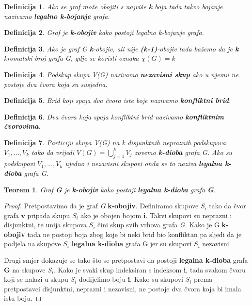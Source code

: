\documentclass[times, utf8, diplomski, numeric]{fer}
\newtheorem{definition}{Definicija}
\newtheorem{theorem}{Teorem}
\begin{document}
\begin{definition}
Ako se graf može obojiti s najviše \textbf{k} boja tada takvo bojanje nazivamo \textbf{legalno k-bojanje} grafa. 
\end{definition}

\begin{definition}
Graf je \textbf{k-obojiv} kako postoji legalno k-bojanje grafa.
\end{definition}


\begin{definition}
Ako je graf G \textbf{k}-obojiv, ali nije \textbf{(k-1)}-obojiv tada kažemo da je \textbf{k} kromatski broj grafa G, gdje se koristi oznaka $\chi(G)=k$  
\end{definition}


\begin{definition}
Podskup skupa V(G) nazivamo \textbf{nezavisni skup} ako u njemu ne postoje dva čvora koja su susjedna.  
\end{definition}

\begin{definition}
Brid koji spaja dva čvora iste boje nazivamo \textbf{konfliktni brid}.
\end{definition}

\begin{definition}
Dva čvora koja spaja konfliktni brid nazivamo \textbf{konfliktnim čvorovima}.
\end{definition}

\begin{definition}
Particiju skupa V(G) na k disjunktnih nepraznih podskupova $V_1,..., V_k$
 tako da vrijedi $V(G) = \bigcup_{j=1}^{k}V_j$ zovemo \textbf{k-dioba} grafa G. Ako su podskupovi  $V_1 ,..., V_k$  ujedno i nezavisni skupovi onda se to naziva \textbf{legalna k-dioba} grafa G.
\end{definition}

\begin{theorem}
\label{thm:dioba}
Graf \textbf{G} je \textbf{k-obojiv} kako postoji \textbf{legalna k-dioba} grafa \textbf{G}.
\end{theorem}

\begin{proof}
Pretpostavimo da je graf \emph{G} \textbf{k-obojiv}. Definiramo skupove $S_i$ tako da čvor grafa $\mathbf{v}$ pripada skupu $S_i$ ako je obojen bojom $\mathbf{i}$. Takvi skupovi su neprazni i disjunktni, te unija skupova $S_i$ čini skup svih vrhova grafa \emph{G}. Kako je G \textbf{k-obojiv} tada ne postoji boja zbog koje bi neki brid bio konfliktan pa sljedi da je podjela na skupove $S_i$ \textbf{legalna k-dioba} grafa G jer su skupovi $S_i$ nezavisni. 

Drugi smjer dokazuje se tako što se pretpostavi da postoji \textbf{legalna k-dioba} grafa \textbf{G} na skupove $S_i$. Kako je svaki skup indeksiran s indeksom \textbf{i}, tada svakom čvoru koji se nalazi u skupu $S_i$ dodijelimo boju \textbf{i}. Kako su skupovi $S_i$ prema pretpostavci disjunktni, neprazni i nezavisni, ne postoje dva čvora koja bi imala istu boju.
\end{proof}
\end{document}
